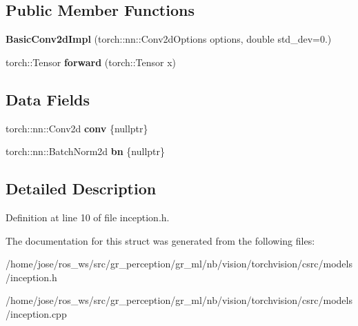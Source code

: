 \subsection*{Public Member Functions}
\begin{DoxyCompactItemize}
\item 
\mbox{\label{structvision_1_1models_1_1__inceptionimpl_1_1BasicConv2dImpl_a96bfecb5ffd28f0879721e961caaa9c6}} 
{\bfseries Basic\+Conv2d\+Impl} (torch\+::nn\+::\+Conv2d\+Options options, double std\+\_\+dev=0.)
\item 
\mbox{\label{structvision_1_1models_1_1__inceptionimpl_1_1BasicConv2dImpl_a7a7a30135a9ea4e72498fb407afc857a}} 
torch\+::\+Tensor {\bfseries forward} (torch\+::\+Tensor x)
\end{DoxyCompactItemize}
\subsection*{Data Fields}
\begin{DoxyCompactItemize}
\item 
\mbox{\label{structvision_1_1models_1_1__inceptionimpl_1_1BasicConv2dImpl_a80f855dd0ad9949b8c5d89677c6b58c2}} 
torch\+::nn\+::\+Conv2d {\bfseries conv} \{nullptr\}
\item 
\mbox{\label{structvision_1_1models_1_1__inceptionimpl_1_1BasicConv2dImpl_af13189e1eb974f9c89578c751bc2d60f}} 
torch\+::nn\+::\+Batch\+Norm2d {\bfseries bn} \{nullptr\}
\end{DoxyCompactItemize}


\subsection{Detailed Description}


Definition at line 10 of file inception.\+h.



The documentation for this struct was generated from the following files\+:\begin{DoxyCompactItemize}
\item 
/home/jose/ros\+\_\+ws/src/gr\+\_\+perception/gr\+\_\+ml/nb/vision/torchvision/csrc/models/inception.\+h\item 
/home/jose/ros\+\_\+ws/src/gr\+\_\+perception/gr\+\_\+ml/nb/vision/torchvision/csrc/models/inception.\+cpp\end{DoxyCompactItemize}
